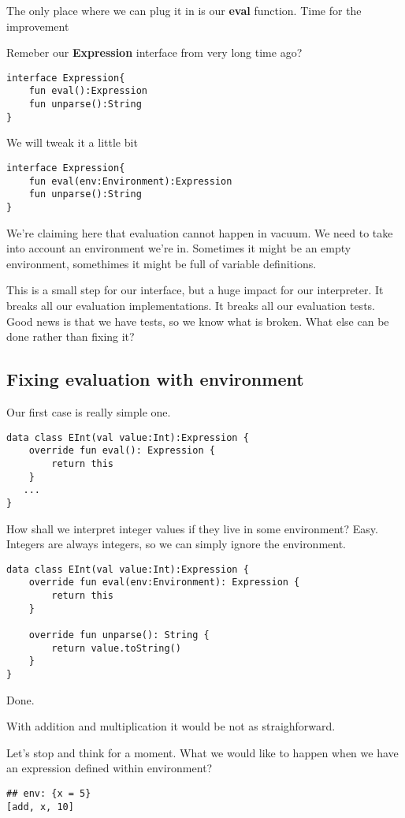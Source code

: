 \documentclass[11pt]{article}
\begin{document}
The only place where we can plug it in is our \textbf{eval} function.
Time for the improvement

Remeber our \textbf{Expression} interface from very long time ago?
\begin{verbatim}
interface Expression{
    fun eval():Expression
    fun unparse():String
}
\end{verbatim}

We will tweak it a little bit

\begin{verbatim}
interface Expression{
    fun eval(env:Environment):Expression
    fun unparse():String
}
\end{verbatim}

We're claiming here that evaluation cannot happen in vacuum. We need to take into account an environment we're in.
Sometimes it might be an empty environment, somethimes it might be full of variable definitions.

This is a small step for our interface, but a huge impact for our interpreter.
It breaks all our evaluation implementations.
It breaks all our evaluation tests.
Good news is that we have tests, so we know what is broken.
What else can be done rather than fixing it?

\subsection{Fixing evaluation with environment}
\label{sec:org6cb6930}
Our first case is really simple one.
\begin{verbatim}
data class EInt(val value:Int):Expression {
    override fun eval(): Expression {
        return this
    }
   ...
}
\end{verbatim}

How shall we interpret integer values if they live in some environment?
Easy. Integers are always integers, so we can simply ignore the environment.

\begin{verbatim}
data class EInt(val value:Int):Expression {
    override fun eval(env:Environment): Expression {
        return this
    }

    override fun unparse(): String {
        return value.toString()
    }
}
\end{verbatim}

Done.

With addition and multiplication it would be not as straighforward.

Let's stop and think for a moment.
What we would like to happen when we have an expression defined within environment?
\begin{verbatim}
## env: {x = 5}
[add, x, 10]
\end{verbatim}
\end{document}
